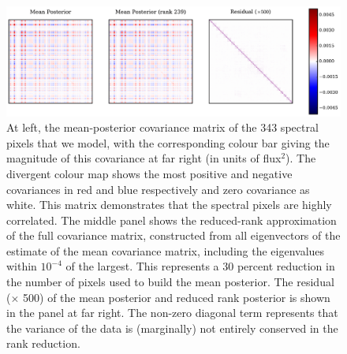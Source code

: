 \documentclass[a4paper,fleqn,usenatbib]{mnras}
\begin{document}
\begin{figure}
	\includegraphics[width=2\columnwidth]{apogee_centers_final_29502_spc_win_wid_1p5_low_rank_covariance.pdf}
    \caption{At left, the mean-posterior covariance matrix of the 343 spectral pixels that we model, with the corresponding colour bar giving the magnitude of this covariance at far right (in units of flux$^2$). The divergent colour map shows the most positive and negative covariances in red and blue respectively and zero covariance as white. This matrix demonstrates that the spectral pixels are highly correlated. The middle panel shows the reduced-rank approximation of the full covariance matrix, constructed from all eigenvectors of the estimate of the mean covariance matrix, including the eigenvalues within $10^{-4}$ of the largest. This represents a 30 percent reduction in the number of pixels used to build the mean posterior. The residual ($\times$ 500) of the mean posterior and reduced rank posterior is shown in the panel at far right.  The non-zero diagonal term represents that the variance of the data is (marginally) not entirely conserved in the rank reduction. }
    \label{fig:inferred_cov}
\end{figure}
\end{document}
